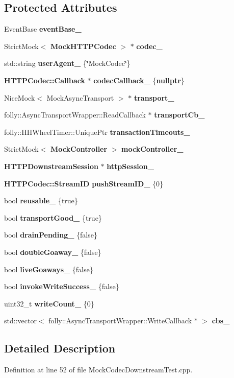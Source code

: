 \subsection*{Protected Attributes}
\begin{DoxyCompactItemize}
\item 
Event\+Base {\bf event\+Base\+\_\+}
\item 
Strict\+Mock$<$ {\bf Mock\+H\+T\+T\+P\+Codec} $>$ $\ast$ {\bf codec\+\_\+}
\item 
std\+::string {\bf user\+Agent\+\_\+} \{\char`\"{}Mock\+Codec\char`\"{}\}
\item 
{\bf H\+T\+T\+P\+Codec\+::\+Callback} $\ast$ {\bf codec\+Callback\+\_\+} \{{\bf nullptr}\}
\item 
Nice\+Mock$<$ Mock\+Async\+Transport $>$ $\ast$ {\bf transport\+\_\+}
\item 
folly\+::\+Async\+Transport\+Wrapper\+::\+Read\+Callback $\ast$ {\bf transport\+Cb\+\_\+}
\item 
folly\+::\+H\+H\+Wheel\+Timer\+::\+Unique\+Ptr {\bf transaction\+Timeouts\+\_\+}
\item 
Strict\+Mock$<$ {\bf Mock\+Controller} $>$ {\bf mock\+Controller\+\_\+}
\item 
{\bf H\+T\+T\+P\+Downstream\+Session} $\ast$ {\bf http\+Session\+\_\+}
\item 
{\bf H\+T\+T\+P\+Codec\+::\+Stream\+ID} {\bf push\+Stream\+I\+D\+\_\+} \{0\}
\item 
bool {\bf reusable\+\_\+} \{true\}
\item 
bool {\bf transport\+Good\+\_\+} \{true\}
\item 
bool {\bf drain\+Pending\+\_\+} \{false\}
\item 
bool {\bf double\+Goaway\+\_\+} \{false\}
\item 
bool {\bf live\+Goaways\+\_\+} \{false\}
\item 
bool {\bf invoke\+Write\+Success\+\_\+} \{false\}
\item 
uint32\+\_\+t {\bf write\+Count\+\_\+} \{0\}
\item 
std\+::vector$<$ folly\+::\+Async\+Transport\+Wrapper\+::\+Write\+Callback $\ast$ $>$ {\bf cbs\+\_\+}
\end{DoxyCompactItemize}


\subsection{Detailed Description}


Definition at line 52 of file Mock\+Codec\+Downstream\+Test.\+cpp.



